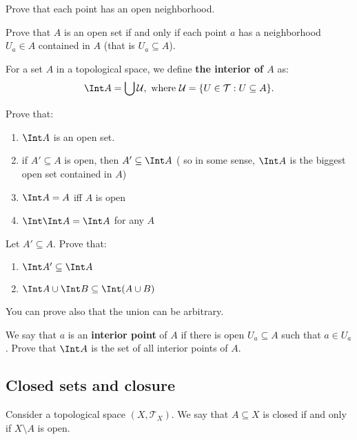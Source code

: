 \begin{prob}
  Prove that each point has an open neighborhood.
\end{prob}

\begin{prob}
  Prove that $A$ is an open set if and only if each point $a$ has
  a neighborhood $U_a\in A$ contained in $A$
  (that is $U_a\subseteq A$).
\end{prob}

\noindent For a set $A$ in a topological space, we define \textbf{the
interior of $A$} as:
$$\Int A=\bigcup \mathcal U, \text{ where } \mathcal U = \{U\in \mathcal T : U\subseteq A \}.$$

\begin{prob}
  Prove that:
  \begin{enumerate}
    \item $\Int A$ is an open set.
    \item if $A'\subseteq A$ is open, then $A'\subseteq \Int A$ (
    so in some sense, $\Int A$ is the biggest open set contained in
    $A$)
    \item $\Int A = A$ iff $A$ is open
    \item $\Int \Int A = \Int A$ for any $A$
  \end{enumerate}
\end{prob}

\begin{prob}
  Let $A'\subseteq A$. Prove that:
  \begin{enumerate}
    \item $\Int A' \subseteq \Int A$
    \item $\Int A \cup \Int B\subseteq \Int (A\cup B)$
  \end{enumerate}
  You can prove also that the union can be arbitrary.
\end{prob}

\begin{prob}
	We say that $a$ is an \textbf{interior point} of $A$ if there is open $U_a\subseteq A$ such that $a\in U_a$. Prove that $\Int A$ is the set
	of all interior points of $A$.
\end{prob}

\subsection{Closed sets and closure}
Consider a topological space $(X, \mathcal T_X)$. We say that $A\subseteq X$ is closed if and only if $X\setminus A$ is open.


